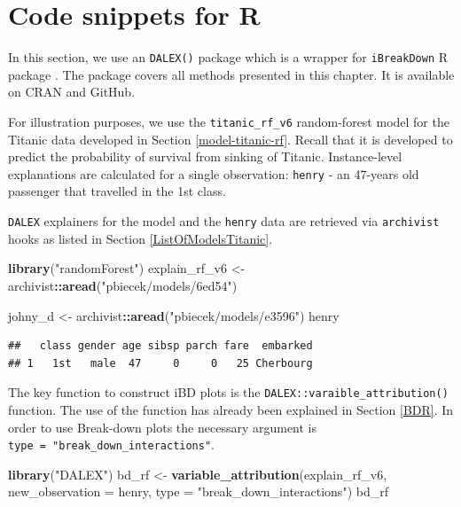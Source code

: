 \documentclass[]{krantz}
\newenvironment{Shaded}{\begin{snugshade}}{\end{snugshade}}
\newcommand{\DataTypeTok}[1]{\textcolor[rgb]{0.13,0.29,0.53}{#1}}
\newcommand{\KeywordTok}[1]{\textcolor[rgb]{0.13,0.29,0.53}{\textbf{#1}}}
\newcommand{\NormalTok}[1]{#1}
\newcommand{\OperatorTok}[1]{\textcolor[rgb]{0.81,0.36,0.00}{\textbf{#1}}}
\newcommand{\StringTok}[1]{\textcolor[rgb]{0.31,0.60,0.02}{#1}}
\begin{document}
\hypertarget{iBDRcode}{%
\section{Code snippets for R}\label{iBDRcode}}

In this section, we use an \texttt{DALEX()} package which is a wrapper for \texttt{iBreakDown} R package \citep{iBreakDownRPackage}. The package covers all methods presented in this chapter. It is available on CRAN and GitHub.

For illustration purposes, we use the \texttt{titanic\_rf\_v6} random-forest model for the Titanic data developed in Section \ref{model-titanic-rf}. Recall that it is developed to predict the probability of survival from sinking of Titanic. Instance-level explanations are calculated for a single observation: \texttt{henry} - an 47-years old passenger that travelled in the 1st class.

\texttt{DALEX} explainers for the model and the \texttt{henry} data are retrieved via \texttt{archivist} hooks as listed in Section \ref{ListOfModelsTitanic}.

\begin{Shaded}
\begin{Highlighting}[]
\KeywordTok{library}\NormalTok{(}\StringTok{"randomForest"}\NormalTok{)}
\NormalTok{explain_rf_v6 <-}\StringTok{ }\NormalTok{archivist}\OperatorTok{::}\KeywordTok{aread}\NormalTok{(}\StringTok{"pbiecek/models/6ed54"}\NormalTok{)}

\NormalTok{johny_d <-}\StringTok{ }\NormalTok{archivist}\OperatorTok{::}\KeywordTok{aread}\NormalTok{(}\StringTok{"pbiecek/models/e3596"}\NormalTok{)}
\NormalTok{henry}
\end{Highlighting}
\end{Shaded}

\begin{verbatim}
##   class gender age sibsp parch fare  embarked
## 1   1st   male  47     0     0   25 Cherbourg
\end{verbatim}

The key function to construct iBD plots is the \texttt{DALEX::varaible\_attribution()} function. The use of the function has already been explained in Section \ref{BDR}. In order to use Break-down plots the necessary argument is \texttt{type\ =\ "break\_down\_interactions"}.

\begin{Shaded}
\begin{Highlighting}[]
\KeywordTok{library}\NormalTok{(}\StringTok{"DALEX"}\NormalTok{)}
\NormalTok{bd_rf <-}\StringTok{ }\KeywordTok{variable_attribution}\NormalTok{(explain_rf_v6,}
                 \DataTypeTok{new_observation =}\NormalTok{ henry,}
                 \DataTypeTok{type =} \StringTok{"break_down_interactions"}\NormalTok{)}
\NormalTok{bd_rf}
\end{Highlighting}
\end{Shaded}
\end{document}
